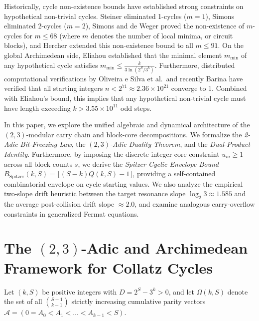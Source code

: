 \documentclass[11pt, a4paper]{amsart}
\theoremstyle{definition}
\newcommand{\A}{\mathcal{A}}
\begin{document}
Historically, cycle non-existence bounds have established strong constraints on hypothetical non-trivial cycles. Steiner \cite{Steiner1977} eliminated 1-cycles ($m = 1$), Simons \cite{Simons2005two} eliminated 2-cycles ($m = 2$), Simons and de Weger \cite{Simons2005} proved the non-existence of $m$-cycles for $m \le 68$ (where $m$ denotes the number of local minima, or circuit blocks), and Hercher \cite{Hercher2023} extended this non-existence bound to all $m \le 91$. On the global Archimedean side, Eliahou \cite{Eliahou1993} established that the minimal element $m_{\min}$ of any hypothetical cycle satisfies $m_{\min} \le \frac{k}{3 \ln(2^S / 3^k)}$. Furthermore, distributed computational verifications by Oliveira e Silva et al.\ and recently Barina \cite{Barina2025} have verified that all starting integers $n < 2^{71} \approx 2.36 \times 10^{21}$ converge to 1. Combined with Eliahou's bound, this implies that any hypothetical non-trivial cycle must have length exceeding $k > 3.55 \times 10^{11}$ odd steps.

In this paper, we explore the unified algebraic and dynamical architecture of the $(2,3)$-modular carry chain and block-core decompositions. We formalize the \emph{2-Adic Bit-Freezing Law}, the \emph{$(2,3)$-Adic Duality Theorem}, and the \emph{Dual-Product Identity}. Furthermore, by imposing the discrete integer core constraint $u_m \ge 1$ across all block counts $s$, we derive the \emph{Spitzer Cyclic Envelope Bound} $B_{\text{Spitzer}}(k, S) = \lfloor (S - k) Q(k, S) - 1 \rfloor$, providing a self-contained combinatorial envelope on cycle starting values. We also analyze the empirical two-slope drift heuristic between the target resonance slope $\log_2 3 \approx 1.585$ and the average post-collision drift slope $\approx 2.0$, and examine analogous carry-overflow constraints in generalized Fermat equations.

\section{The $(2,3)$-Adic and Archimedean Framework for Collatz Cycles}

Let $(k, S)$ be positive integers with $D = 2^S - 3^k > 0$, and let $\Omega(k, S)$ denote the set of all $\binom{S-1}{k-1}$ strictly increasing cumulative parity vectors $\A = (0 = A_0 < A_1 < \dots < A_{k-1} < S)$.
\end{document}
